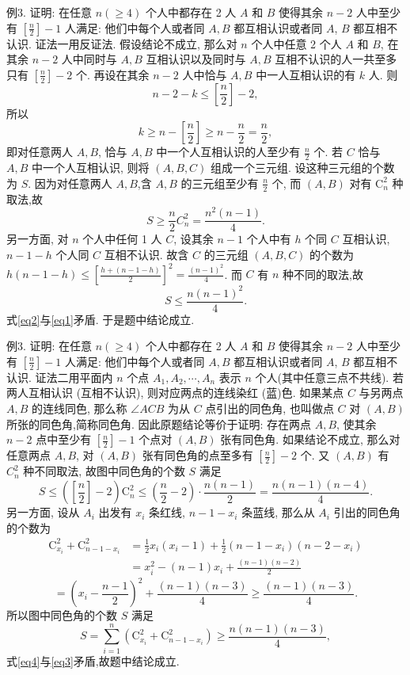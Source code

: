 例3. 证明: 在任意 $n(\geqslant 4)$ 个人中都存在 2 人 $A$ 和 $B$ 使得其余 $n-2$ 人中至少有 $\left[\frac{n}{2}\right]-1$ 人满足: 他们中每个人或者同 $A, B$ 都互相认识或者同 $A$, $B$ 都互相不认识.
证法一用反证法.
假设结论不成立, 那么对 $n$ 个人中任意 2 个人 $A$ 和 $B$, 在其余 $n-2$ 人中同时与 $A, B$ 互相认识以及同时与 $A, B$ 互相不认识的人一共至多只有 $\left[\frac{n}{2}\right]-2$ 个.
再设在其余 $n-2$ 人中恰与 $A, B$ 中一人互相认识的有 $k$ 人.
则
$$
n-2-k \leqslant\left[\frac{n}{2}\right]-2,
$$
所以
$$
k \geqslant n-\left[\frac{n}{2}\right] \geqslant n-\frac{n}{2}=\frac{n}{2},
$$
即对任意两人 $A, B$, 恰与 $A, B$ 中一个人互相认识的人至少有 $\frac{n}{2}$ 个.
若 $C$ 恰与 $A, B$ 中一个人互相认识, 则将 $(A, B, C)$ 组成一个三元组.
设这种三元组的个数为 $S$.
因为对任意两人 $A, B$,含 $A, B$ 的三元组至少有 $\frac{n}{2}$ 个, 而 $(A, B)$ 对有 $\mathrm{C}_n^2$ 种取法,故
$$
S \geqslant \frac{n}{2} C_n^2=\frac{n^2(n-1)}{4} . \label{eq1}
$$
另一方面, 对 $n$ 个人中任何 1 人 $C$, 设其余 $n-1$ 个人中有 $h$ 个同 $C$ 互相认识, $n-1-h$ 个人同 $C$ 互相不认识.
故含 $C$ 的三元组 $(A, B, C)$ 的个数为 $h(n-1-h) \leqslant\left[\frac{h+(n-1-h)}{2}\right]^2=\frac{(n-1)^2}{4}$. 而 $C$ 有 $n$ 种不同的取法,故
$$
S \leqslant \frac{n(n-1)^2}{4} . \label{eq2}
$$
式\ref{eq2}与\ref{eq1}矛盾.
于是题中结论成立.



例3. 证明: 在任意 $n(\geqslant 4)$ 个人中都存在 2 人 $A$ 和 $B$ 使得其余 $n-2$ 人中至少有 $\left[\frac{n}{2}\right]-1$ 人满足: 他们中每个人或者同 $A, B$ 都互相认识或者同 $A$, $B$ 都互相不认识.
证法二用平面内 $n$ 个点 $A_1, A_2, \cdots, A_n$ 表示 $n$ 个人(其中任意三点不共线). 若两人互相认识 (互相不认识), 则对应两点的连线染红 (蓝)色.
如果某点 $C$ 与另两点 $A, B$ 的连线同色, 那么称 $\angle A C B$ 为从 $C$ 点引出的同色角, 也叫做点 $C$ 对 $(A, B)$ 所张的同色角,简称同色角.
因此原题结论等价于证明: 存在两点 $A, B$, 使其余 $n-2$ 点中至少有 $\left[\frac{n}{2}\right]-1$ 个点对 $(A, B)$ 张有同色角.
如果结论不成立, 那么对任意两点 $A, B$, 对 $(A, B)$ 张有同色角的点至多有 $\left[\frac{n}{2}\right]-2$ 个.
又 $(A, B)$ 有 $C_n^2$ 种不同取法, 故图中同色角的个数 $S$ 满足
$$
S \leqslant\left(\left[\frac{n}{2}\right]-2\right) \mathrm{C}_n^2 \leqslant\left(\frac{n}{2}-2\right) \cdot \frac{n(n-1)}{2}=\frac{n(n-1)(n-4)}{4} . \label{eq3}
$$
另一方面, 设从 $A_i$ 出发有 $x_i$ 条红线, $n-1-x_i$ 条蓝线, 那么从 $A_i$ 引出的同色角的个数为
$$
\begin{aligned}
\mathrm{C}_{x_i}^2+\mathrm{C}_{n-1-x_i}^2 & =\frac{1}{2} x_i\left(x_i-1\right)+\frac{1}{2}\left(n-1-x_i\right)\left(n-2-x_i\right) \\
& =x_i^2-(n-1) x_i+\frac{(n-1)(n-2)}{2}
\end{aligned}
$$
$$
=\left(x_i-\frac{n-1}{2}\right)^2+\frac{(n-1)(n-3)}{4} \geqslant \frac{(n-1)(n-3)}{4} .
$$
所以图中同色角的个数 $S$ 满足
$$
S=\sum_{i=1}^n\left(\mathrm{C}_{x_i}^2+\mathrm{C}_{n-1-x_i}^2\right) \geqslant \frac{n(n-1)(n-3)}{4}, \label{eq4}
$$
式\ref{eq4}与\ref{eq3}矛盾,故题中结论成立.



